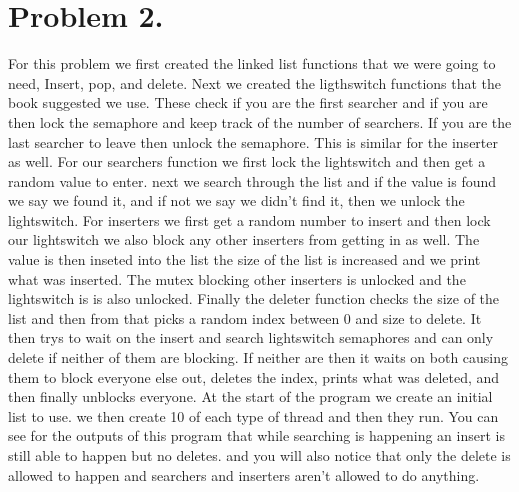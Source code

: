 \documentclass[letterpaper,10pt,titlepage]{article}
\begin{document}
\section{Problem 2.} For this problem we first created the linked list functions 
that we were going to need, Insert, pop, and delete. Next we created the 
ligthswitch functions that the book suggested we use. These check if you are 
the first searcher and if you are then lock the semaphore and keep track of 
the number of searchers. If you are the last searcher to leave then unlock 
the semaphore. This is similar for the inserter as well. For our searchers 
function we first lock the lightswitch and then get a random value to enter. 
next we search through the list and if the value is found we say we found it, 
and if not we say we didn't find it, then we unlock the lightswitch. For 
inserters we first get a random number to insert and then lock our lightswitch 
we also block any other inserters from getting in as well. The value is then 
inseted into the list the size of the list is increased and we print what was 
inserted. The mutex blocking other inserters is unlocked and the lightswitch is 
is also unlocked. Finally the deleter function checks the size of the list and 
then from that picks a random index between 0 and size to delete. It then trys 
to wait on the insert and search lightswitch semaphores and can only delete 
if neither of them are blocking. If neither are then it waits on both causing 
them to block everyone else out, deletes the index, prints what was deleted, 
and then finally unblocks everyone. At the start of the program we create an 
initial list to use. we then create 10 of each type of thread and then they 
run. You can see for the outputs of this program that while searching is 
happening an insert is still able to happen but no deletes. and you will 
also notice that only the delete is allowed to happen and searchers and 
inserters aren't allowed to do anything.
\end{document}

